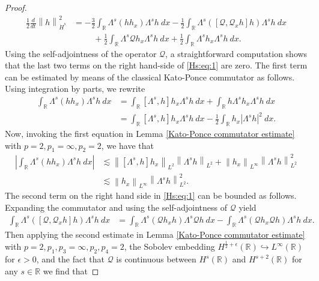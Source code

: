 \documentclass[final,11pt,a4paper,reqno]{amsart}
\newcommand{\norm}[1]{\left\| #1 \right\|}
\newcommand{\av}[1]{\left| #1 \right|}
\newcommand{\RR}{\mathbb R}
\theoremstyle{definition}
\begin{document}
\begin{proof}
\begin{align}
\frac{1}{2}\frac{d}{dt}\norm{h}_{\dot{H}^{s}}^{2}&=-\frac{3}{2}\int_{\RR} \Lambda^{s}(hh_{x})\Lambda^{s}h \ dx-\frac{1}{2}\int_{\RR}\Lambda^{s}\left([\mathscr{Q},\mathscr{Q}_{x}h]h\right)\Lambda^{s}h \ dx \label{Hs:eq:1} \\
&\hspace{1cm}+\frac{1}{2}\int_{\RR} \Lambda^{s}\mathscr{Q}h_{x} \Lambda^{s}h \ dx +\frac{1}{2}\int _{\RR}\Lambda^{s}h_{x} \Lambda^{s}h\ dx. \nonumber
\end{align}
Using the self-adjointness of the operator $\mathscr{Q}$, a straightforward computation shows that the last two terms on the right hand-side of \eqref{Hs:eq:1} are zero. The first term can be estimated by means of the classical Kato-Ponce commutator as follows. Using integration by parts, we rewrite 
\begin{align*}
\int_{\RR} \Lambda^{s}(hh_{x})\Lambda^{s}h \ dx&= \int_{\RR} [\Lambda^{s},h]h_{x}\Lambda^{s}h \ dx + \int_{\RR} h \Lambda^{s}h_{x}\Lambda^{s}h \ dx \\
&= \int_{\RR} [\Lambda^{s},h]h_{x}\Lambda^{s}h \ dx-\frac{1}{2} \int_{\RR} h_{x} |\Lambda^{s}h|^{2} \ dx.
\end{align*}
Now, invoking the first equation in Lemma \ref{Kato-Ponce commutator estimate} with $p=2, p_{1}=\infty, p_{2}=2$, we have that
\begin{align}
\av{\int_{\RR} \Lambda^{s}(hh_{x})\Lambda^{s}h \ dx} &\lesssim  \norm{[\Lambda^{s},h]h_{x}}_{L^{2}}\norm{\Lambda^{s}h}_{L^{2}}+ \norm{h_{x}}_{L^\infty}\norm{\Lambda^{s}h}^{2}_{L^{2}} \nonumber \\
&\lesssim  \norm{h_{x}}_{L^\infty}\norm{\Lambda^{s}h}^{2}_{L^{2}}. \label{Hs:est:1}
\end{align}
The second term on the right hand side in \eqref{Hs:eq:1} can be bounded as follows.
Expanding the commutator and using the self-adjointness of $\mathscr{Q}$ yield
\begin{align}
\int_{\RR}\Lambda^{s}\left([\mathscr{Q},\mathscr{Q}_{x}h]h\right)\Lambda^{s}h \ dx &= \int_{\RR} \Lambda^{s}(\mathscr{Q}h_{x}h)\Lambda^{s}\mathscr{Q}h \ dx -\int_{\RR} \Lambda^{s}(\mathscr{Q}h_{x}\mathscr{Q}h)\Lambda^{s}h \ dx.
\end{align}
Then applying the second estimate in Lemma \ref{Kato-Ponce commutator estimate} with $p=2, p_{1},p_{3}=\infty, p_{2},p_{4}=2$, the Sobolev embedding  $H^{\frac{1}{2}+\epsilon}(\RR)\hookrightarrow L^{\infty}(\RR)$ for $\epsilon>0$, and the fact that  $\mathscr{Q}$ is continuous between $H^{s}(\RR)$  and $H^{s+2}(\RR)$ for any $s\in \RR$  we find that

\end{proof}
\end{document}
